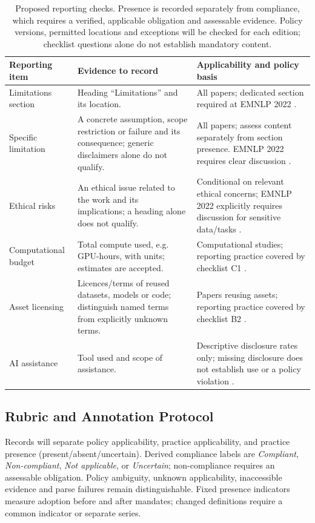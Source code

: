 \documentclass[11pt]{article}
\begin{document}
\begin{table}[t]
\centering\small
\begin{tabularx}{\textwidth}{@{}p{}p{}X@{}}
\toprule
Reporting item & Evidence to record & Applicability and policy basis \\
\midrule
Limitations section & Heading ``Limitations'' and its location. & All papers; dedicated section required at EMNLP 2022 \cite{emnlp2022cfp}. \\
Specific limitation & A concrete assumption, scope restriction or failure and its consequence; generic disclaimers alone do not qualify. & All papers; assess content separately from section presence. EMNLP 2022 requires clear discussion \cite{emnlp2022cfp}. \\
Ethical risks & An ethical issue related to the work and its implications; a heading alone does not qualify. & Conditional on relevant ethical concerns; EMNLP 2022 explicitly requires discussion for sensitive data/tasks \cite{emnlp2022cfp}. \\
Computational budget & Total compute used, e.g. GPU-hours, with units; estimates are accepted. & Computational studies; reporting practice covered by checklist C1 \cite{arrresponsible}. \\
Asset licensing & Licences/terms of reused datasets, models or code; distinguish named terms from explicitly unknown terms. & Papers reusing assets; reporting practice covered by checklist B2 \cite{arrresponsible}. \\
AI assistance & Tool used and scope of assistance. & Descriptive disclosure rates only; missing disclosure does not establish use or a policy violation \cite{acl2023ai}. \\
\bottomrule
\end{tabularx}
\caption{Proposed reporting checks. Presence is recorded separately from compliance, which requires a verified, applicable obligation and assessable evidence. Policy versions, permitted locations and exceptions will be checked for each edition; checklist questions alone do not establish mandatory content.}
\label{tab:rubric}
\end{table}

\subsection{Rubric and Annotation Protocol}
Records will separate policy applicability, practice applicability, and practice presence (present/absent/uncertain). Derived compliance labels are \emph{Compliant}, \emph{Non-compliant}, \emph{Not applicable}, or \emph{Uncertain}; non-compliance requires an assessable obligation. Policy ambiguity, unknown applicability, inaccessible evidence and parse failures remain distinguishable. Fixed presence indicators measure adoption before and after mandates; changed definitions require a common indicator or separate series.
\end{document}
